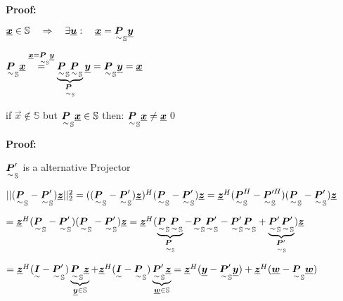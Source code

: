


\textbf{Proof: }

$\vec{x}\in\mathbb{S} \pfeil \exists\vec{u}: \quad \vec{x}=\ma{P}_{\mathbb{S}}\vec{y}$

$\ma{P}_{\mathbb{S}}\vec{x} \overset{\vec{x}=\ma{P}_{\mathbb{S}}\vec{y}}{=}\underbrace{\ma{P}_{\mathbb{S}}\ma{P}_{\mathbb{S}}}_{\ma{P}_{\mathbb{S}}}\vec{y}=\ma{P}_{\mathbb{S}}\vec{y}=\vec{x}$


if $\vec{x}\notin\mathbb{S}$ but $\ma{P}_\mathbb{S}\vec{x}\in\mathbb{S}$ then: $\ma{P}_\mathbb{S}\vec{x}\neq\vec{x}$\qed



\textbf{Proof: }

$\ma{P}_\mathbb{S}'$ is a alternative Projector

$||(\ma{P}_\mathbb{S}-\ma{P}_\mathbb{S}')\vec{z} ||_2^2\\=((\ma{P}_\mathbb{S}-\ma{P}_\mathbb{S}')\vec{z})^H(\ma{P}_\mathbb{S}-\ma{P}_\mathbb{S}')\vec{z}
=\vec{z}^H(\ma{P}_\mathbb{S}^H-\ma{P}_\mathbb{S}'^H)(\ma{P}_\mathbb{S}-\ma{P}_\mathbb{S}')\vec{z}$

$=\vec{z}^H(\ma{P}_\mathbb{S}-\ma{P}_\mathbb{S}')(\ma{P}_\mathbb{S}-\ma{P}_\mathbb{S}')\vec{z}
=\vec{z}^H(\underbrace{\ma{P}_\mathbb{S}\ma{P}_\mathbb{S}}_{\ma{P}_\mathbb{S}}-\ma{P}_\mathbb{S}\ma{P}_\mathbb{S}'-\ma{P}_\mathbb{S}'\ma{P}_\mathbb{S}+\underbrace{\ma{P}_\mathbb{S}'\ma{P}_\mathbb{S}'}_{\ma{P}_\mathbb{S}'})\vec{z}$

$=\vec{z}^H(\ma{I}-\ma{P}_\mathbb{S}')\underbrace{\ma{P}_\mathbb{S}\vec{z}}_{\vec{y}\in\mathbb{S}}+\vec{z}^H(\ma{I}-\ma{P}_\mathbb{S})\underbrace{\ma{P}_\mathbb{S}'\vec{z}}_{\vec{w}\in\mathbb{S}}=
\vec{z}^H(\vec{y}-\ma{P}'_\mathbb{S}\vec{y})+\vec{z}^H(\vec{w}-\ma{P}_\mathbb{S}\vec{w})$

